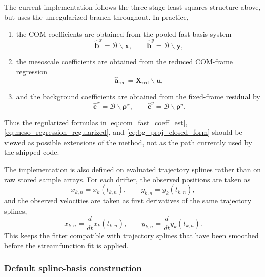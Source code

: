 The current implementation follows the three-stage least-squares structure above, but uses the
unregularized branch throughout. In practice,
\begin{enumerate}
    \item the COM coefficients are obtained from the pooled fast-basis system
    \begin{equation}
    \hat{\mathbf{b}}^x = \mathcal{B} \backslash \mathbf{x},
    \qquad
    \hat{\mathbf{b}}^y = \mathcal{B} \backslash \mathbf{y},
    \end{equation}
    \item the mesoscale coefficients are obtained from the reduced COM-frame regression
    \begin{equation}
    \hat{\mathbf{a}}_{\mathrm{red}} = \mathbf{X}_{\mathrm{red}} \backslash \mathbf{u},
    \end{equation}
    \item and the background coefficients are obtained from the fixed-frame residual by
    \begin{equation}
    \hat{\mathbf{c}}^x = \mathcal{B} \backslash \boldsymbol{\rho}^x,
    \qquad
    \hat{\mathbf{c}}^y = \mathcal{B} \backslash \boldsymbol{\rho}^y.
    \end{equation}
\end{enumerate}
Thus the regularized formulas in
\eqref{eq:com_fast_coeff_est}, \eqref{eq:meso_regression_regularized}, and
\eqref{eq:bg_proj_closed_form} should be viewed as possible extensions of the method, not as
the path currently used by the shipped code.

The implementation is also defined on evaluated trajectory splines rather than on raw stored
sample arrays. For each drifter, the observed positions are taken as
\begin{equation}
x_{k,n} = x_k(t_{k,n}),
\qquad
y_{k,n} = y_k(t_{k,n}),
\end{equation}
and the observed velocities are taken as first derivatives of the same trajectory splines,
\begin{equation}
\dot{x}_{k,n} = \frac{d}{dt}x_k(t_{k,n}),
\qquad
\dot{y}_{k,n} = \frac{d}{dt}y_k(t_{k,n}).
\end{equation}
This keeps the fitter compatible with trajectory splines that have been smoothed before the
streamfunction fit is applied.

\subsubsection{Default spline-basis construction}

